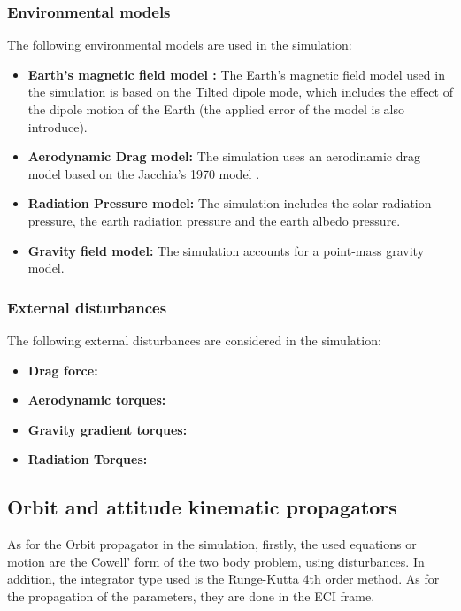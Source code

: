 \subsubsection{Environmental models}
The following environmental models are used in the simulation:
\begin{itemize}
    \item \textbf{Earth's magnetic field model \cite{Tilted_Dipole}:} The Earth's magnetic field model used in the simulation is based
    on the Tilted dipole mode, which includes the effect of the dipole motion of the Earth (the applied error of the model is also introduce).
    \item \textbf{Aerodynamic Drag model:} The simulation uses an aerodinamic drag model based on the Jacchia's 1970 model
    \cite{J70_atmosphere}. 
    \item \textbf{Radiation Pressure model:} The simulation includes the solar radiation pressure, the earth radiation
    pressure and the earth albedo pressure.
    \item \textbf{Gravity field model:} The simulation accounts for a point-mass gravity model.
\end{itemize}

\subsubsection{External disturbances}
The following external disturbances are considered in the simulation:
\begin{itemize}
    \item \textbf{Drag force:} 
    \item \textbf{Aerodynamic torques:} 
    \item \textbf{Gravity gradient torques:} 
    \item \textbf{Radiation Torques:} 
\end{itemize}

\subsection{Orbit and attitude kinematic propagators}

As for the Orbit propagator in the simulation, firstly, the used equations or motion are the Cowell'
form of the two body problem, using  disturbances. In addition, the integrator type used is the Runge-Kutta 4th order method.
As for the propagation of the parameters, they are done in the ECI frame.\vspace{0.2em}


